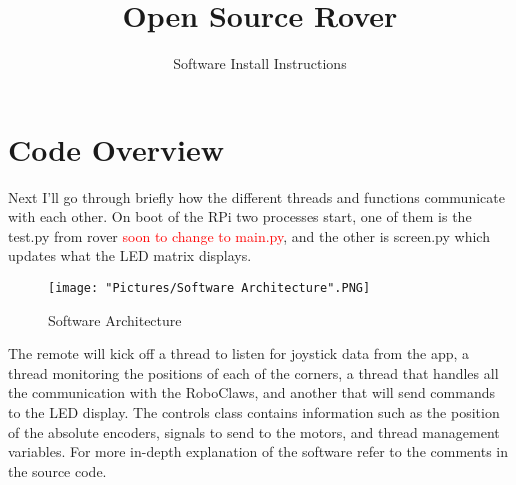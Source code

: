 \documentclass[12pt]{article}
\begin{document}
\title{Open Source Rover}
\author{Software Install Instructions}

\makeatletter         
\def\@maketitle{
\begin{center}	
	\makebox[\textwidth][c]{ \texttt{[image: "Pictures/software title".png]}}
	{\Huge \bfseries \sffamily \@title }\\[4ex] 
	{\huge \bfseries \sffamily \@author}\\[4ex] 
	\texttt{[image: "Pictures/JPL logo".png]}
\end{center}}
\makeatother

\maketitle

\newpage

\tableofcontents

\newpage


\section{Code Overview}
Next I'll go through briefly how the different threads and functions communicate with each other. On boot of the RPi two processes start, one of them is the test.py from rover \textcolor{red}{soon to change to main.py}, and the other is screen.py which updates what the LED matrix displays. 

\begin{figure}[H]
 	\centering
	\texttt{[image: "Pictures/Software Architecture".PNG]}
 	\caption{Software Architecture}
	\label{Software Architecture}
\end{figure}
The remote will kick off a thread to listen for joystick data from the app, a thread monitoring the positions of each of the corners, a thread that handles all the communication with the RoboClaws, and another that will send commands to the LED display. The controls class contains information such as the position of the absolute encoders, signals to send to the motors, and thread management variables. For more in-depth explanation of the software refer to the comments in the source code. 
\end{document}
